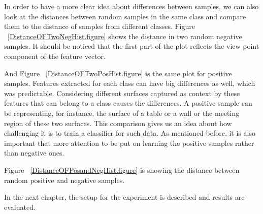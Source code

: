 In order to have a more clear idea about differences between samples, we can also look at the distances between random samples
in the same class and compare them to the distance of samples from different classes. 
Figure ~\ref{DistanceOFTwoNegHist.figure} shows the distance in two random negative samples. 
It should be noticed that the first part of the plot reflects the view point component of the feature vector.
 


And Figure ~\ref{DistanceOFTwoPosHist.figure} is the same plot for positive samples. 
Features extracted for each class can have big differences as well, which was predictable. 
Considering different surfaces captured as context by these features that can belong to a class causes the differences. 
A positive sample can be representing, for instance, the surface of a table or a wall or the meeting region of these 
two surfaces. 
This comparison gives us an idea about how challenging it is to train a classifier for such data.
As mentioned before, it is also important that more attention to be put on learning the positive samples rather than 
negative ones. 



Figure ~\ref{DistanceOFPosandNegHist.figure} is showing the distance between random positive and negative samples.

In the next chapter, the setup for the experiment is described and results are evaluated.


